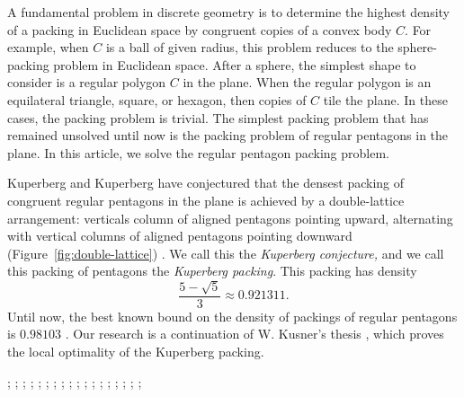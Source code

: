 A fundamental problem in discrete geometry is to determine the highest density of a packing
in Euclidean space by congruent copies of a convex body $C$.   For example, when $C$ is a ball
of given radius, this problem reduces to the sphere-packing problem in Euclidean space.
After a sphere, the simplest shape to consider is a regular polygon $C$ in the plane.
When the regular polygon is an equilateral triangle, square, or hexagon, then copies of $C$ tile
the plane.  In these cases, the packing problem is trivial.  The simplest packing problem
that has remained unsolved until now is the packing problem of regular pentagons in the plane.
In this article, we solve the regular pentagon packing problem.

Kuperberg and Kuperberg
 have conjectured that the
densest packing of congruent regular pentagons in the plane is
achieved by a double-lattice arrangement: verticals column of aligned
pentagons pointing upward, alternating with vertical columns of
aligned pentagons pointing downward (Figure~\ref{fig:double-lattice}) \cite{Kup}.  We call this the {\it Kuperberg
  conjecture,}  and we call this packing of pentagons the {\it Kuperberg packing}.
This packing has density
\[
\frac{5 - \sqrt{5}}3 \approx 0.921311.
\] %
Until now, the best known bound on the density of packings of regular
pentagons is $0.98103$ \cite{Val}.
Our research is a continuation of W. Kusner's thesis \cite{Kus}, which proves
the local optimality of the Kuperberg packing.


{
;  %
;  %
;  
;  %
; 
;  
;  
;  %
; 
;  
;  
;  %
;  %
; 
;  %
; 
;  
;   
}


